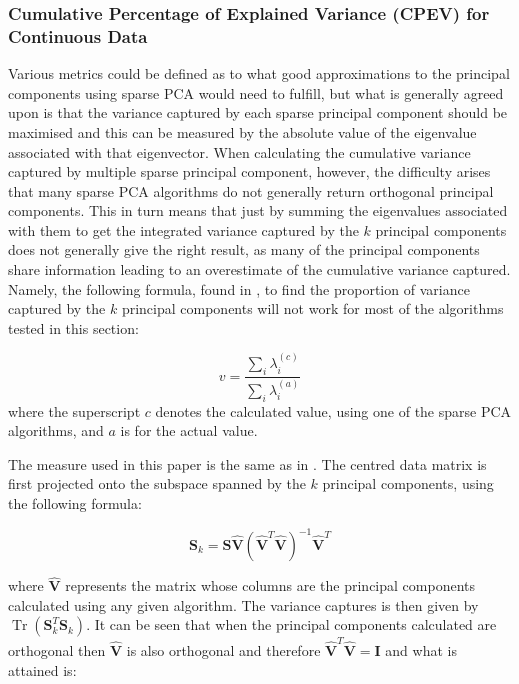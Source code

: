 \documentclass[11pt,a4paper]{article}
\DeclareMathOperator{\Tr}{Tr}
\begin{document}
\subsubsection{Cumulative Percentage of Explained Variance (CPEV) for Continuous Data}
Various metrics could be defined as to what good approximations to the principal components using sparse PCA would need to fulfill, but what is generally agreed upon is that the variance captured by each sparse principal component should be maximised and this can be measured by the absolute value of the eigenvalue associated with that eigenvector. When calculating the cumulative variance captured by multiple sparse principal component, however, the difficulty arises that many sparse PCA algorithms do not generally return orthogonal principal components. This in turn means that just by summing the eigenvalues associated with them to get the integrated variance captured by the $k$ principal components does not generally give the right result, as many of the principal components share information leading to an overestimate of the cumulative variance captured. Namely, the following formula, found in \cite{dimakis}, to find the proportion of variance captured by the $k$ principal components will not work for most of the algorithms tested in this section:

\begin{equation*}
v = \frac{\sum_{i}\lambda^{(c)}_i}{\sum_{i}\lambda^{(a)}_i}
\end{equation*}
where the superscript $c$ denotes the calculated value, using one of the sparse PCA algorithms, and $a$ is for the actual value.

The measure used in this paper is the same as in \cite{shen}. The centred data matrix is first projected onto the subspace spanned by the $k$ principal components, using the following formula:

\begin{equation}
\mathbf{S}_k = \mathbf{S}\mathbf{\hat{V}}\left(\mathbf{\hat{V}}^T\mathbf{\hat{V}}\right)^{-1} \mathbf{\hat{V}}^T
\label{captured_var}
\end{equation}

where $\mathbf{\hat{V}}$ represents the matrix whose columns are the principal components calculated using any given algorithm. The variance captures is then given by $\Tr\left( \mathbf{S}_k^T\mathbf{S}_k\right)$. It can be seen that when the principal components calculated are orthogonal then $\mathbf{\hat{V}}$ is also orthogonal and therefore $\mathbf{\hat{V}}^T\mathbf{\hat{V}} = \mathbf{I}$ and what is attained is:
\end{document}

